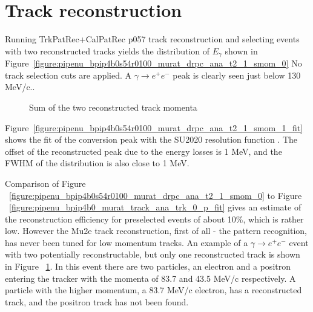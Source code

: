 %
\section{Track reconstruction}

Running TrkPatRec+CalPatRec p057 track reconstruction and selecting events
with two reconstructed tracks yields the distribution of $E_\gamma$
shown in Figure~\ref{figure:pipenu_bpip4b0s54r0100_murat_drpc_ana_t2_1_smom_0}
No track selection cuts are applied. A $\gamma \to e^+e^-$ peak  is clearly seen just below
130 MeV/c..

\begin{figure}[H]
  \caption{
    \label{figure:pipenu_bpip4b0s54r0100_murat_drpc_ana_t2_1_smom_0}
    Sum of the two reconstructed track momenta
  }
  \label{figure:event_display}
\end{figure}

Figure~\ref{figure:pipenu_bpip4b0s54r0100_murat_drpc_ana_t2_1_smom_1_fit} shows the fit
of the conversion peak with the SU2020 resolution function \cite{MU2E_SU2020_PAPER}.
The offset of the reconstructed peak due to the energy losses is 1 MeV, and the FWHM
of the distribution is also close to 1 MeV.

Comparison of Figure ~\ref{figure:pipenu_bpip4b0s54r0100_murat_drpc_ana_t2_1_smom_0} 
to Figure ~\ref{figure:pipenu_bpip4b0_murat_track_ana_trk_0_p_fit}
gives an estimate of the reconstruction efficiency for preselected events of about 10\%,
which is rather low.
%
However the Mu2e track reconstruction, first of all - the pattern recognition,
has never been tuned for low momentum tracks. An example of a $\gamma \to e^+e^-$
event with two potentially reconstructable, but only one reconstructed track
is shown in Figure ~\ref{figure:event_display}. In this event there are two particles,
an electron and a positron entering the tracker with the momenta of 83.7 and 43.5 MeV/c
respectively. A particle with the higher momentum, a 83.7 MeV/c electron, has a reconstructed track,
and  the positron track has not been found.  

